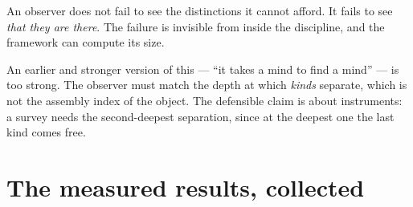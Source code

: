 \begin{principle}
\label{prin:fewerkinds}
An observer does not fail to see the distinctions it cannot afford. It fails to
see \emph{that they are there}. The failure is invisible from inside the
discipline, and the framework can compute its size.
\end{principle}

\begin{remark}
An earlier and stronger version of this --- ``it takes a mind to find a mind'' ---
is too strong. The observer must match the depth at which \emph{kinds} separate,
which is not the assembly index of the object. The defensible claim is about
instruments: a survey needs the second-deepest separation, since at the deepest
one the last kind comes free.
\end{remark}

\section{The measured results, collected}
\label{sec:collected}

\begin{table}[h]
\centering
\small
\renewcommand{\arraystretch}{1.25}

\caption{The headline measurements, repeated from Table~\ref{tab:collected0} for
readers who came straight to this part. Every figure is produced by a simulation
shipped with its note.}
\label{tab:collected}
\end{table}
